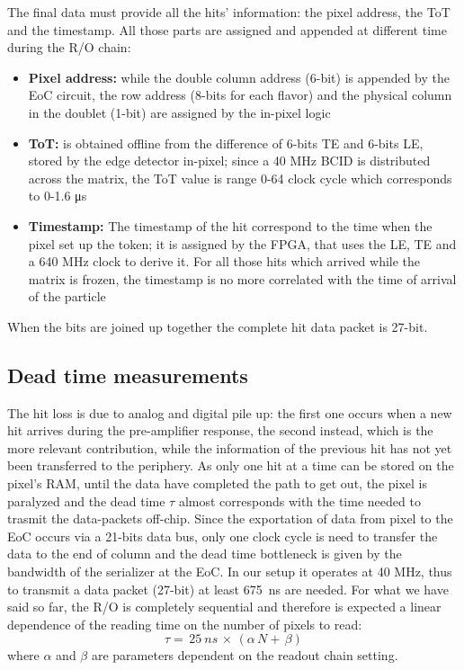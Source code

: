     The final data must provide all the hits' information: the pixel address, the ToT and the timestamp. All those parts are assigned and appended at different time during the R/O chain:  
    \begin{itemize}
        \item\textbf{Pixel address:} while the double column address (6-bit) is appended by the EoC circuit, the row address (8-bits for each flavor) and the physical column in the doublet (1-bit) are assigned by the in-pixel logic      
        \item \textbf{ToT:} is obtained offline from the difference of 6-bits TE and 6-bits LE, stored by the edge detector in-pixel; since a 40 MHz BCID is distributed across the matrix, the ToT value is range 0-64 clock cycle which corresponds to 0-1.6 \si{\us}  
        \item \textbf{Timestamp:} The timestamp of the hit correspond to the time when the pixel set up the token; it is assigned by the FPGA, that uses the LE, TE and a 640 MHz clock to derive it. For all those hits which arrived while the matrix is frozen, the timestamp is no more correlated with the time of arrival of the particle         
    \end{itemize}
    When the bits are joined up together the complete hit data packet is 27-bit. 

    \subsection{Dead time measurements}
        The hit loss is due to analog and digital pile up: the first one occurs when a new hit arrives during the pre-amplifier response, the second instead, which is the more relevant contribution, while the information of the previous hit has not yet been transferred to the periphery.  
        As only one hit at a time can be stored on the pixel's RAM, until the data have completed the path to get out, the pixel is paralyzed and the dead time $\tau$ almost corresponds with the time needed to trasmit the data-packets off-chip.
        Since the exportation of data from pixel to the EoC occurs via a 21-bits data bus, only one clock cycle is need to transfer the data to the end of column and the dead time bottleneck is given by the bandwidth of the serializer at the EoC. In our setup it operates at 40 MHz, thus to transmit a data packet (27-bit) at least \SI{675}{ns} are needed. 
        For what we have said so far, the R/O is completely sequential and therefore is expected a linear dependence of the reading time on the number of pixels to read:
        \begin{equation}
            \tau =\, 25\: \unit{ns}\, \times\, (\alpha\, N +\, \beta)
            \label{eq:reading_time}
        \end{equation}
        where $\alpha$ and $\beta$ are parameters dependent on the readout chain setting. 
        
